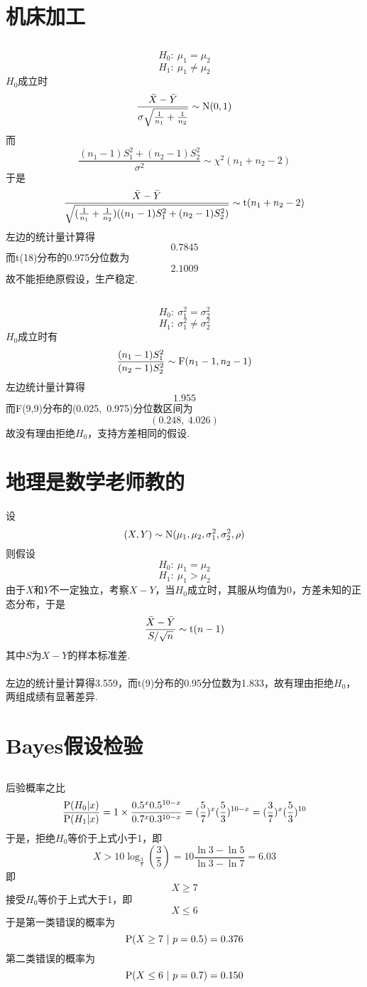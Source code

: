 \documentclass{article}
\begin{document}
\begin{CJK}{UTF8}{gbsn}
\section{机床加工}
\subsection{}
$$ H_{0}:\ \mu_{1}=\mu_{2} $$
$$ H_{1}:\ \mu_{1}\neq\mu_{2} $$
$H_{0}$成立时
$$ \frac{\bar{X}-\bar{Y}}{\sigma\sqrt{\frac{1}{n_{1}}+\frac{1}{n_{2}}}}\sim{\rm N}(0,1)$$
而
$$ \frac{(n_{1}-1)S_{1}^{2}+(n_{2}-1)S_{2}^{2}}{\sigma^{2}}\sim\chi^{2}(n_{1}+n_{2}-2)$$
于是
$$ \frac{\bar{X}-\bar{Y}}{\sqrt{(\frac{1}{n_{1}}+\frac{1}{n_{2}})((n_{1}-1)S_{1}^{2}+(n_{2}-1)S_{2}^{2})}}\sim{\rm t}(n_{1}+n_{2}-2)$$
左边的统计量计算得
$$ 0.7845 $$
而t(18)分布的0.975分位数为
$$ 2.1009 $$
故不能拒绝原假设，生产稳定.
\subsection{}
$$ H_{0}:\ \sigma_{1}^{2}=\sigma_{2}^{2}$$
$$ H_{1}:\ \sigma_{1}^{2}\neq\sigma_{2}^{2}$$
$H_{0}$成立时有
$$ \frac{(n_{1}-1)S_{1}^{2}}{(n_{2}-1)S_{2}^{2}}\sim{\rm F}(n_{1}-1,n_{2}-1)$$
左边统计量计算得
$$ 1.955 $$
而F(9,9)分布的(0.025,\ 0.975)分位数区间为
$$ (0.248,\ 4.026) $$
故没有理由拒绝$H_{0}$，支持方差相同的假设.
\section{地理是数学老师教的}
设
$$ (X,Y)\sim{\rm N}(\mu_{1},\mu_{2},\sigma_{1}^{2},\sigma_{2}^{2},\rho) $$
则假设
$$ H_{0}:\ \mu_{1}=\mu_{2} $$
$$ H_{1}:\ \mu_{1}>\mu_{2} $$
由于$X$和$Y$不一定独立，考察$X-Y$，当$H_{0}$成立时，其服从均值为0，方差未知的正态分布，于是
$$ \frac{\bar{X}-\bar{Y}}{S/\sqrt{n}}\sim{\rm t}(n-1)$$
其中$S$为$X-Y$的样本标准差.
\\\\左边的统计量计算得3.559，而t(9)分布的0.95分位数为1.833，故有理由拒绝$H_{0}$，两组成绩有显著差异.
\section{Bayes假设检验}
\subsection{}
后验概率之比
$$ \frac{{\rm P}(H_{0}\vert x)}{{\rm P}(H_{1}\vert x)}=1\times\frac{0.5^{x}0.5^{10-x}}{0.7^{x}0.3^{10-x}}=(\frac{5}{7})^{x}(\frac{5}{3})^{10-x}=(\frac{3}{7})^{x}(\frac{5}{3})^{10}$$
于是，拒绝$H_{0}$等价于上式小于1，即
$$ X>10\log_{\frac{3}{7}}(\frac{3}{5})=10\frac{\ln3-\ln5}{\ln3-\ln7}=6.03$$
即
$$ X\geq 7 $$
接受$H_{0}$等价于上式大于1，即
$$ X\leq 6 $$
于是第一类错误的概率为
$$ {\rm P}(X\geq 7\ \vert\ p=0.5)=0.376$$
第二类错误的概率为
$$ {\rm P}(X\leq 6\ \vert\ p=0.7)=0.150$$

\end{CJK}
\end{document}

